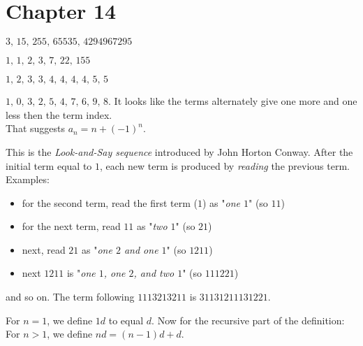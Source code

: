    \section*{Chapter 14}
\begin{Solution}{14.1}
$3,\,15,\,255,\,65535,\,4294967295$
\end{Solution}

\begin{Solution}{14.2}
$1,\,1,\,2,\,3,\,7,\,22,\,155$
\end{Solution}

\begin{Solution}{14.3}
$1,\,2,\, 3,\,3,\,4,\,4,\,4,\,4,\,5,\,5$ 
\end{Solution}

\begin{Solution}{14.4}
$1,\,0,\,3,\,2,\,5,\,4,\,7,\,6,\,9,\,8$. It looks like the terms alternately give one more and one less then the term index.\\
 That suggests $a_n = n +(-1)^n$.
\end{Solution}

\begin{Solution}{14.5}
This is the {\itshape Look{-}and{-}Say sequence} introduced by John Horton Conway. After the initial term equal to $1$, each new term is produced by {\itshape reading} the previous term. Examples:
\begin{itemize}
\item for the second term, read the first term ($1$) as "{\itshape one $1$}" (so $11$)
\item for the next term, read $11$ as "{\itshape two $1$}" (so $21$)
\item next, read $21$ as "{\itshape one $2$ and one $1$}" (so $1211$)
\item next $1211$ is "{\itshape one $1$, one $2$, and two $1$}" (so $111221$)
\end{itemize}
and so on. The term following $1113213211$ is $31131211131221$.
\end{Solution}

\begin{Solution}{14.6}
For $n=1$, we define $1d$ to equal $d$. Now for the recursive part of the definition: 
For $n>1$, we define $nd = (n-1)d + d$.
\end{Solution}
